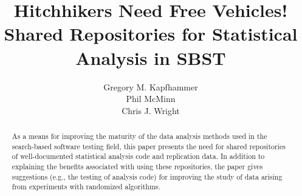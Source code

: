 \documentclass{sig-alternate}
\begin{document}
\title{Hitchhikers Need Free Vehicles! \\ Shared Repositories for Statistical Analysis in SBST \vspace*{-.05in}}


\author{
\alignauthor
Gregory M. Kapfhammer\\
\alignauthor
Phil McMinn\\
\alignauthor
Chris J. Wright\\
}

\maketitle

\begin{abstract}
  As a means for improving the maturity of the data analysis methods used in the search-based software testing
  field, this paper presents the need for shared repositories of well-documented statistical analysis code and
  replication data. In addition to explaining the benefits associated with using these repositories, the paper gives
  suggestions (e.g., the testing of analysis code) for improving the study of data arising from experiments with
  randomized algorithms. \vspace*{-1em}
\end{abstract}






\vspace*{-.5em}

\scriptsize


\end{document}
